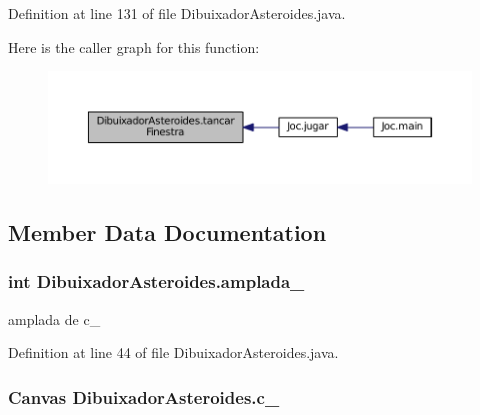 Definition at line 131 of file Dibuixador\+Asteroides.\+java.



Here is the caller graph for this function\+:\nopagebreak
\begin{figure}[H]
\begin{center}
\leavevmode
\includegraphics[width=350pt]{class_dibuixador_asteroides_a14186d7acd8ca135252848f916416575_icgraph}
\end{center}
\end{figure}




\subsection{Member Data Documentation}
\hypertarget{class_dibuixador_asteroides_ac5680a5fd826ac9a412b9739f5f64a12}{}
\subsubsection[{amplada\+\_\+}]{\setlength{\rightskip}{0pt plus 5cm}int Dibuixador\+Asteroides.\+amplada\+\_\+\hspace{0.3cm}{\ttfamily [private]}}\label{class_dibuixador_asteroides_ac5680a5fd826ac9a412b9739f5f64a12}


amplada de c\+\_\+ 



Definition at line 44 of file Dibuixador\+Asteroides.\+java.

\hypertarget{class_dibuixador_asteroides_a634f3d95d02d08c9d21d2eef2c3bb410}{}
\subsubsection[{c\+\_\+}]{\setlength{\rightskip}{0pt plus 5cm}Canvas Dibuixador\+Asteroides.\+c\+\_\+\hspace{0.3cm}{\ttfamily [private]}}\label{class_dibuixador_asteroides_a634f3d95d02d08c9d21d2eef2c3bb410}



